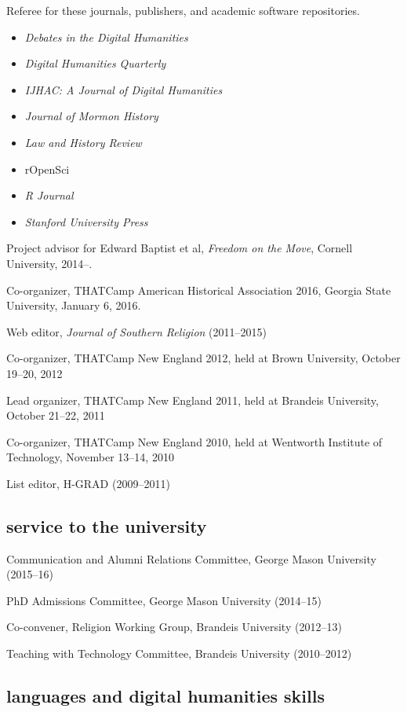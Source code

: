 \documentclass[11pt]{article}
\providecommand{\tightlist}{%
  \setlength{\itemsep}{0pt}\setlength{\parskip}{0pt}}
\begin{document}
Referee for these journals, publishers, and academic software repositories.

\vspace{-0.25in}
\begin{itemize}
    \tightlist
  \item \emph{Debates in the Digital Humanities}
  \item \emph{Digital Humanities Quarterly}
  \item \emph{IJHAC: A Journal of Digital Humanities}
  \item \emph{Journal of Mormon History}
  \item \emph{Law and History Review}
  \item rOpenSci
  \item \emph{R Journal}
  \item \emph{Stanford University Press}
\end{itemize}

Project advisor for Edward Baptist et al, \emph{Freedom on the Move}, Cornell 
University, 2014--.

Co-organizer, THATCamp American Historical Association 2016, Georgia State University, January 6, 2016.

Web editor, \emph{Journal of Southern Religion} (2011--2015)

Co-organizer, THATCamp New England 2012, held at Brown University,
October 19--20, 2012

Lead organizer, THATCamp New England 2011, held at Brandeis University,
October 21--22, 2011

Co-organizer, THATCamp New England 2010, held at Wentworth Institute of
Technology, November 13--14, 2010

List editor, H-GRAD (2009--2011)

\subsection{service to the university}\label{service-university}

Communication and Alumni Relations Committee, George Mason University 
(2015--16)

PhD Admissions Committee, George Mason University (2014--15)

Co-convener, Religion Working Group, Brandeis University (2012--13)

Teaching with Technology Committee, Brandeis University (2010--2012)


\subsection{languages and digital humanities
  skills}\label{languages-and-digital-humanities-skills}
\end{document}
